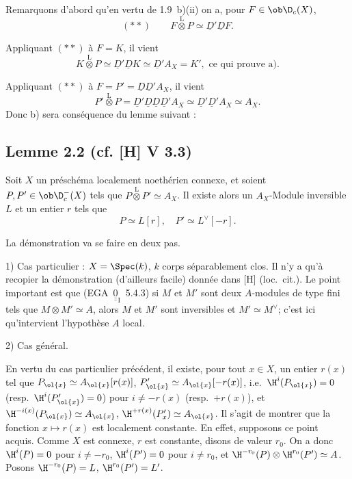Remarquons d'abord qu'en vertu de 1.9~b)(ii) on a, pour $F \in \ob \D_c(X)$,
\[
(**) \qquad F \mathop{\otimes}\limits^{\mathrm{L}} P \simeq \underline{D}'\underline{D} F.
\]

Appliquant $(**)$ à $F = K$, il vient
\[
K \mathop{\otimes}\limits^{\mathrm{L}} P \simeq \underline{D}'\underline{D} K \simeq \underline{D}' A_X = K', \text{ ce qui prouve a).}
\]

Appliquant $(**)$ à $F = P' = \underline{D}\underline{D}'A_X$, il vient
\[
P' \mathop{\otimes}\limits^{\mathrm{L}} P = \underline{D}'\underline{D}\underline{D}\underline{D}'A_X \simeq \underline{D}'\underline{D}'A_X \simeq A_X.
\]
Donc b) sera conséquence du lemme suivant :

\subsection*{Lemme 2.2 (cf. [H] V 3.3)}
Soit $X$ un préschéma localement noethérien connexe, et soient $P, P' \in \ob \D_c^{-}(X)$ tels que $P \mathop{\otimes}\limits^{\mathrm{L}} P' \simeq A_X$. Il existe alors un $A_X$-Module inversible $L$ et un entier $r$ tels que
\[
P \simeq L[r], \quad P' \simeq L^{\vee}[-r].
\]

La démonstration va se faire en deux pas.

1) Cas particulier : $X = \Spec(k)$, $k$ corps séparablement clos. Il n'y a qu'à recopier la démonstration (d'ailleurs facile) donnée dans [H] (loc.~cit.). Le point important est que (EGA~$\underline{\underline{0}}_{\mathrm{I}}$~5.4.3) si $M$ et $M'$ sont deux $A$-modules de type fini tels que $M \otimes M' \simeq A$, alors $M$ et $M'$ sont inversibles et $M' \simeq M^{\vee}$; c'est ici qu'intervient l'hypothèse $A$ local.

2) Cas général.

En vertu du cas particulier précédent, il existe, pour tout $x \in X$, un entier $r(x)$ tel que $P_{\ol{x}} \simeq A_{\ol{x}}[r(x)]$, $P'_{\ol{x}} \simeq A_{\ol{x}}[-r(x)]$, i.e.~$\H^i(P_{\ol{x}}) = 0$ (resp.~$\H^i(P'_{\ol{x}}) = 0$) pour $i \neq -r(x)$ (resp.~$+r(x)$), et $\H^{-i(x)}(P_{\ol{x}}) \simeq A_{\ol{x}}$, $\H^{+r(x)}(P'_{x}) \simeq A_{\ol{x}}$. Il s'agit de montrer que la fonction $x \mapsto r(x)$ est localement constante. En effet, supposons ce
point acquis. Comme $X$ est connexe, $r$ est constante, disons de valeur $r_0$. On a donc $\H^i(P) = 0$ pour $i \neq -r_0$, $\H^i(P') = 0$ pour $i \neq r_0$, et $\H^{-r_0}(P) \otimes \H^{r_0}(P') \simeq A$. Posons $\H^{-r_0}(P) = L$, $\H^{r_0}(P') = L'$.

